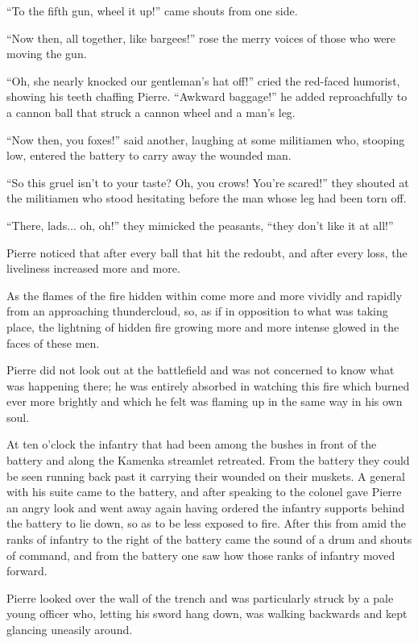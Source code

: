 ``To the fifth gun, wheel it up!'' came shouts from one side.

``Now then, all together, like bargees!'' rose the merry voices
of those who were moving the gun.

``Oh, she nearly knocked our gentleman's hat off!'' cried the
red-faced humorist, showing his teeth chaffing Pierre. ``Awkward
baggage!'' he added reproachfully to a cannon ball that struck a
cannon wheel and a man's leg.

``Now then, you foxes!'' said another, laughing at some
militiamen who, stooping low, entered the battery to carry away
the wounded man.

``So this gruel isn't to your taste? Oh, you crows! You're
scared!'' they shouted at the militiamen who stood hesitating
before the man whose leg had been torn off.

``There, lads... oh, oh!'' they mimicked the peasants, ``they
don't like it at all!''

Pierre noticed that after every ball that hit the redoubt, and
after every loss, the liveliness increased more and more.

As the flames of the fire hidden within come more and more
vividly and rapidly from an approaching thundercloud, so, as if
in opposition to what was taking place, the lightning of hidden
fire growing more and more intense glowed in the faces of these
men.

Pierre did not look out at the battlefield and was not concerned
to know what was happening there; he was entirely absorbed in
watching this fire which burned ever more brightly and which he
felt was flaming up in the same way in his own soul.

At ten o'clock the infantry that had been among the bushes in
front of the battery and along the Kamenka streamlet
retreated. From the battery they could be seen running back past
it carrying their wounded on their muskets. A general with his
suite came to the battery, and after speaking to the colonel gave
Pierre an angry look and went away again having ordered the
infantry supports behind the battery to lie down, so as to be
less exposed to fire. After this from amid the ranks of infantry
to the right of the battery came the sound of a drum and shouts
of command, and from the battery one saw how those ranks of
infantry moved forward.

Pierre looked over the wall of the trench and was particularly
struck by a pale young officer who, letting his sword hang down,
was walking backwards and kept glancing uneasily around.

